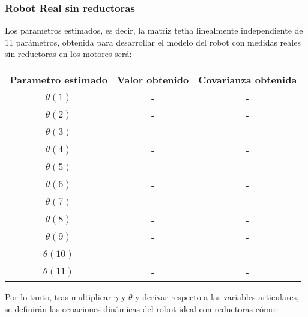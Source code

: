 \subsubsection{Robot Real sin reductoras}
Los parametros estimados, es decir, la matriz tetha linealmente independiente de 11 parámetros, obtenida para desarrollar el modelo del robot con medidas reales sin reductoras en los motores será: 
\begin{center}
	\begin{tabular}{| c | c | c |}

		\hline
		Parametro estimado & Valor obtenido & Covarianza obtenida \\
		\hline
		$\theta(1) $ & - & - \\
		\hline
		$\theta(2) $ & - & - \\
		\hline
		$\theta(3) $ & - & - \\
		\hline
		$\theta(4) $ & - & - \\
		\hline
		$\theta(5) $ & - & - \\
		\hline
		$\theta(6) $ & - & - \\
		\hline
		$\theta(7) $ & - & - \\
		\hline
		$\theta(8) $ & - & - \\
		\hline
		$\theta(9) $ & - & - \\
		\hline
		$\theta(10) $ & - & - \\
		\hline
		$\theta(11) $ & - & - \\
		\hline
	\end{tabular}
\end{center}
Por lo tanto, tras multiplicar $\gamma$ y $\theta$ y derivar respecto a las variables articulares, se definirán las ecuaciones dinámicas del robot ideal con reductoras cómo:\\

